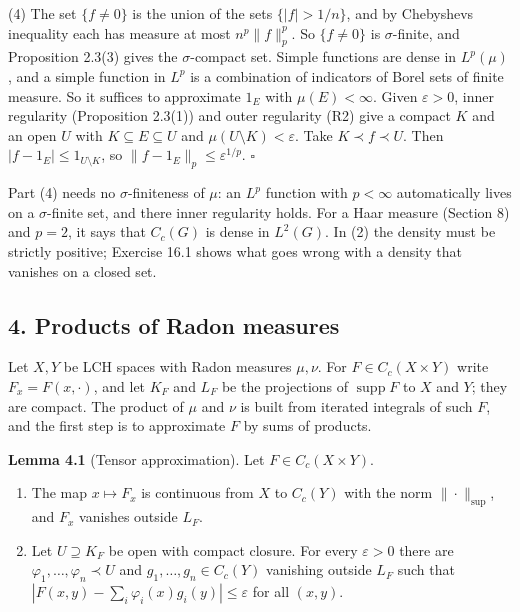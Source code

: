 \documentclass[
  english,
  11pt,
  a4paper,
]{article}
\providecommand{\tightlist}{%
  \setlength{\itemsep}{0pt}\setlength{\parskip}{0pt}}
\begin{document}
(4) The set \(\{f\neq0\}\) is the union of the sets \(\{|f|>1/n\}\), and
by Chebyshev\textquotesingle s inequality each has measure at most
\(n^p\|f\|_p^p\). So \(\{f\neq0\}\) is \(\sigma\)-finite, and
Proposition 2.3(3) gives the \(\sigma\)-compact set. Simple functions
are dense in \(L^p(\mu)\), and a simple function in \(L^p\) is a
combination of indicators of Borel sets of finite measure. So it
suffices to approximate \(1_E\) with \(\mu(E)<\infty\). Given
\(\varepsilon>0\), inner regularity (Proposition 2.3(1)) and outer
regularity (R2) give a compact \(K\) and an open \(U\) with
\(K\subseteq E\subseteq U\) and \(\mu(U\setminus K)<\varepsilon\). Take
\(K\prec f\prec U\). Then \(|f-1_E|\leq1_{U\setminus K}\), so
\(\|f-1_E\|_p\leq\varepsilon^{1/p}\). \(\square\)

Part (4) needs no \(\sigma\)-finiteness of \(\mu\): an \(L^p\) function
with \(p<\infty\) automatically lives on a \(\sigma\)-finite set, and
there inner regularity holds. For a Haar measure (Section 8) and
\(p=2\), it says that \(C_c(G)\) is dense in \(L^2(G)\). In (2) the
density must be strictly positive; Exercise 16.1 shows what goes wrong
with a density that vanishes on a closed set.

\subsection[4. Products of Radon
measures]{\texorpdfstring{\protect\hypertarget{haar-measure-on-locally-compact-groups--oa-fnd-hm-03}{}{}4.
Products of Radon
measures}{4. Products of Radon measures}}\label{haar-measure-on-locally-compact-groups--OA-FND-HM-03}

Let \(X,Y\) be LCH spaces with Radon measures \(\mu,\nu\). For
\(F\in C_c(X\times Y)\) write \(F_x=F(x,\cdot)\), and let \(K_F\) and
\(L_F\) be the projections of \(\operatorname{supp}F\) to \(X\) and
\(Y\); they are compact. The product of \(\mu\) and \(\nu\) is built
from iterated integrals of such \(F\), and the first step is to
approximate \(F\) by sums of products.

\textbf{Lemma 4.1} (Tensor approximation). Let \(F\in C_c(X\times Y)\).

\begin{enumerate}
\tightlist
\item
  The map \(x\mapsto F_x\) is continuous from \(X\) to \(C_c(Y)\) with
  the norm \(\|\cdot\|_{\sup}\), and \(F_x\) vanishes outside \(L_F\).
\item
  Let \(U\supseteq K_F\) be open with compact closure. For every
  \(\varepsilon>0\) there are \(\varphi_1,\dots,\varphi_n\prec U\) and
  \(g_1,\dots,g_n\in C_c(Y)\) vanishing outside \(L_F\) such that
  \(|F(x,y)-\sum_i\varphi_i(x)g_i(y)|\leq\varepsilon\) for all
  \((x,y)\).
\end{enumerate}
\end{document}
